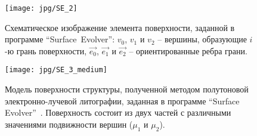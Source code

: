 \begin{figure}
	\centering
	\texttt{[image: jpg/SE\_2]}
	\vspace{0.5em}
	\caption{Схематическое изображение элемента поверхности, заданной в программе ``Surface~Evolver'': $v_0$, $v_1$ и $v_2$ -- вершины, образующие $i$-ю грань поверхности, $\vec{e_0}$, $\vec{e_1}$ и $\vec{e_2}$ -- ориентированные ребра грани.}
	\label{fig:SE_12}
\end{figure}

\begin{figure}[h]
	\begin{center}
		\texttt{[image: jpg/SE\_3\_medium]}
		\vspace{1em}
		\caption{Модель поверхности структуры, полученной методом полутоновой электронно-лучевой литографии, заданная в программе ``Surface Evolver''~\cite{Kirchner_reflow}. Поверхность состоит из двух частей с различными значениями подвижности вершин ($\mu_1$ и $\mu_2$).}
		\label{fig:SE_3}
	\end{center}
\end{figure}

